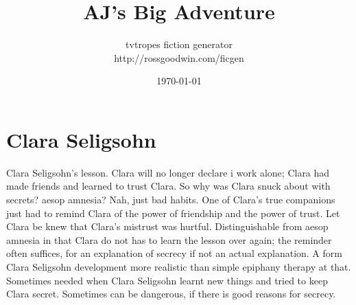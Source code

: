 \documentclass[12pt]{book}
\title{AJ's Big Adventure}
\author{tvtropes fiction generator\\http://rossgoodwin.com/ficgen}
\date{\today}
\begin{document}
\maketitle


\chapter{Clara Seligsohn}
Clara Seligsohn's lesson. Clara will no longer declare i work alone; Clara had made friends and learned to trust Clara. So why was Clara snuck about with secrets? aesop amnesia? Nah, just bad habits. One of Clara's true companions just had to remind Clara of the power of friendship and the power of trust. Let Clara be knew that Clara's mistrust was hurtful. Distinguishable from aesop amnesia in that Clara do not has to learn the lesson over again; the reminder often suffices, for an explanation of secrecy if not an actual explanation. A form Clara Seligsohn development more realistic than simple epiphany therapy at that. Sometimes needed when Clara Seligsohn learnt new things and tried to keep Clara secret. Sometimes can be dangerous, if there is good reasons for secrecy.
\end{document}
